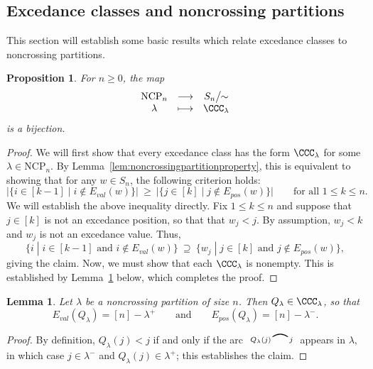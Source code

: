 \documentclass[12pt]{amsart}
\newtheorem{prop}[equation]{Proposition}
\newtheorem{lem}[equation]{Lemma}
\theoremstyle{definition}
\theoremstyle{remark}
\numberwithin{equation}{section}
\renewcommand{\setminus}{-}
\newcommand{\NCP}{\mathrm{NCP}}
\newcommand{\EP}{E_{pos}}
\newcommand{\EV}{E_{val}}
\newcommand{\edge}[2]{\tikz[scale = 0.75, baseline = -0.2cm]{
\draw (0.1, 0) node[inner sep = 0ex] (a) {};
\node[left, xshift = 0.1cm, yshift = -0.1cm] at (a) {$\scriptstyle #1$};
\draw (0.9, 0)  node[inner sep = 0ex] (b) {};
\node[right, xshift = -0.1cm, yshift = -0.1cm] at (b) {$\scriptstyle #2$};
\draw[thick] (a) to[out = 35, in = 145] (b);}}
\begin{document}
\subsection{Excedance classes and noncrossing partitions}
\label{sec:ex1}

This section will establish some basic results which relate excedance classes to noncrossing partitions.  

\begin{prop}
For $n \ge 0$, the map
\[
\begin{array}{ccc}
\NCP_{n} & \longrightarrow & S_{n}\big/\!\!\sim \\
\lambda & \longmapsto & \CCC_{\lambda}
\end{array}
\]
is a bijection.
\end{prop}
\begin{proof}
We will first show that every excedance class has the form $\CCC_{\lambda}$ for some $\lambda \in \NCP_{n}$.  
By Lemma~\ref{lem:noncrossingpartitionproperty}, this is equivalent to showing that for any $w \in S_{n}$, the following criterion holds:
\[
\Big|\big\{i \in [k-1] \;|\; i \notin \EV(w)\big\}\Big| \ \ge\  \Big|\big\{ j \in [k] \;|\; j \notin \EP(w)\big\}\Big| \qquad\text{for all $1 \le k \le n$}.
\]
We will establish the above inequality directly.  Fix $1 \le k \le n$ and suppose that $j \in [k]$ is not an excedance position, so that that $w_{j} < j$.  By assumption, $w_{j} < k$ and $w_{j}$ is not an excedance value.  Thus, 
\[
\big\{i \;|\; \text{$i \in [k-1]$ and $i \notin \EV(w)$} \big\}\  \supseteq\  \big\{w_{j} \;|\; \text{$j \in [k]$ and $j \notin \EP(w)$}\big\},
\]
giving the claim.  Now, we must show that each $\CCC_{\lambda}$ is nonempty.  This is established by Lemma~\ref{lem:QSVexcedance} below, which completes the proof.
\end{proof}


\begin{lem}
\label{lem:QSVexcedance}
Let $\lambda$ be a noncrossing partition of size $n$.  Then $Q_{\lambda} \in \CCC_{\lambda}$, so that
\[
\EV(Q_{\lambda}) = [n] \setminus \lambda^{+}
\qquad\text{and}\qquad
\EP(Q_{\lambda}) = [n] \setminus \lambda^{-}.
\]
\end{lem}
\begin{proof}
By definition, $Q_{\lambda}(j) < j$ if and only if the arc $ \edge{Q_{\lambda}(j)}{j}$ appears in $\lambda$, in which case $j \in \lambda^{-}$ and $Q_{\lambda}(j) \in \lambda^{+}$; this establishes the claim.
\end{proof}
\end{document}
